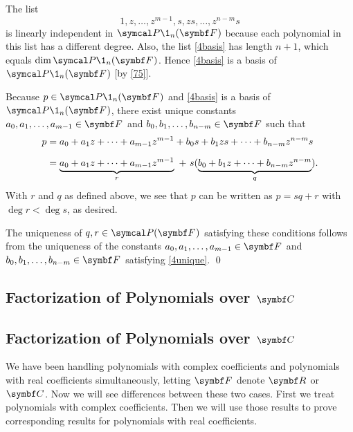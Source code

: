 The list
\begin{equation} \label{4basis}
1, z, \ldots, z^{m-1}, s, zs, \ldots, z^{n-m} s
\end{equation}%
is linearly independent in $\P\1_n(\F{})$ because each polynomial in this list has a different degree. Also, the list \ref{4basis} has length $n+1$, which equals $ \dim \P\1_n(\F{})$. Hence \ref{4basis} is a basis of $\P\1_n(\F{})$ [by \ref{75}].

Because $p \in \P\1_n(\F{})$ and \ref{4basis} is a basis of $\P\1_n(\F{})$, there exist unique constants
$
a_0, a_1, \ldots, a_{m-1} \in \F{}$ and $b_0, b_1, \ldots, b_{n-m} \in \F{}
$
such that
\begin{align}
p &= a_0 + a_1 z + \cdots + a_{m-1} z^{m-1} + b_0 s + b_1  zs + \cdots + b_{n-m}z^{n-m} s \label{4unique}\\[6bp]
&= \underbrace{a_0 + a_1 z + \cdots + a_{m-1} z^{m-1}}_r \ +\  s(\underbrace{b_0 + b_1  z + \cdots + b_{n-m}z^{n-m}}_q). \notag
\end{align}
With $r$ and $q$ as defined above, we see that  $p$ can be written as $p=sq+r$ with $\deg r < \deg s$, as desired.

The uniqueness of $q, r \in \P(\F{})$ satisfying these conditions follows from the uniqueness of the constants $
a_0, a_1, \ldots, a_{m-1} \in \F{}$ and $b_0, b_1, \ldots, b_{n-m} \in \F{}
$
satisfying \ref{4unique}.
\qed

\ifnum{}
    \subsection{\texorpdfstring{Factorization of Polynomials over $\C{}$}{Factorization of Polynomials over C}} %
    \else
    \subsection{Factorization of Polynomials over $\C{}$}
    \fi


We have been handling polynomials with complex coefficients and polynomials with real coefficients simultaneously, letting $\F{}$ denote $\R{}$ or $\C{}$.  Now we will see differences between these two cases.  First we treat polynomials with complex coefficients.  Then we will use those results to prove corresponding results for polynomials with real coefficients.


